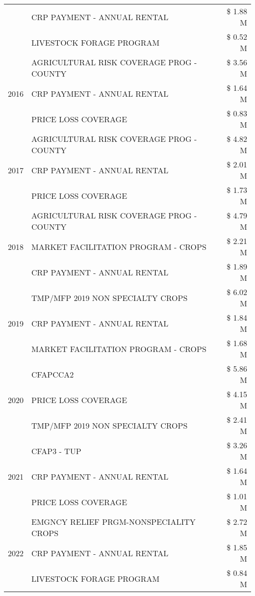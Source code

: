 \begin{tabular}{llr}
 & CRP PAYMENT - ANNUAL RENTAL & \$ 1.88 M \\
 & LIVESTOCK FORAGE PROGRAM & \$ 0.52 M \\
\cline{1-3}
\multirow[t]{3}{*}{2016} & AGRICULTURAL RISK COVERAGE PROG - COUNTY & \$ 3.56 M \\
 & CRP PAYMENT - ANNUAL RENTAL & \$ 1.64 M \\
 & PRICE LOSS COVERAGE & \$ 0.83 M \\
\cline{1-3}
\multirow[t]{3}{*}{2017} & AGRICULTURAL RISK COVERAGE PROG - COUNTY & \$ 4.82 M \\
 & CRP PAYMENT - ANNUAL RENTAL & \$ 2.01 M \\
 & PRICE LOSS COVERAGE & \$ 1.73 M \\
\cline{1-3}
\multirow[t]{3}{*}{2018} & AGRICULTURAL RISK COVERAGE PROG - COUNTY & \$ 4.79 M \\
 & MARKET FACILITATION PROGRAM - CROPS & \$ 2.21 M \\
 & CRP PAYMENT - ANNUAL RENTAL & \$ 1.89 M \\
\cline{1-3}
\multirow[t]{3}{*}{2019} & TMP/MFP 2019 NON SPECIALTY CROPS & \$ 6.02 M \\
 & CRP PAYMENT - ANNUAL RENTAL & \$ 1.84 M \\
 & MARKET FACILITATION PROGRAM - CROPS & \$ 1.68 M \\
\cline{1-3}
\multirow[t]{3}{*}{2020} & CFAPCCA2 & \$ 5.86 M \\
 & PRICE LOSS COVERAGE & \$ 4.15 M \\
 & TMP/MFP 2019 NON SPECIALTY CROPS & \$ 2.41 M \\
\cline{1-3}
\multirow[t]{3}{*}{2021} & CFAP3 - TUP & \$ 3.26 M \\
 & CRP PAYMENT - ANNUAL RENTAL & \$ 1.64 M \\
 & PRICE LOSS COVERAGE & \$ 1.01 M \\
\cline{1-3}
\multirow[t]{3}{*}{2022} & EMGNCY RELIEF PRGM-NONSPECIALITY CROPS & \$ 2.72 M \\
 & CRP PAYMENT - ANNUAL RENTAL & \$ 1.85 M \\
 & LIVESTOCK FORAGE PROGRAM & \$ 0.84 M \\
\cline{1-3}
\bottomrule
\end{tabular}
